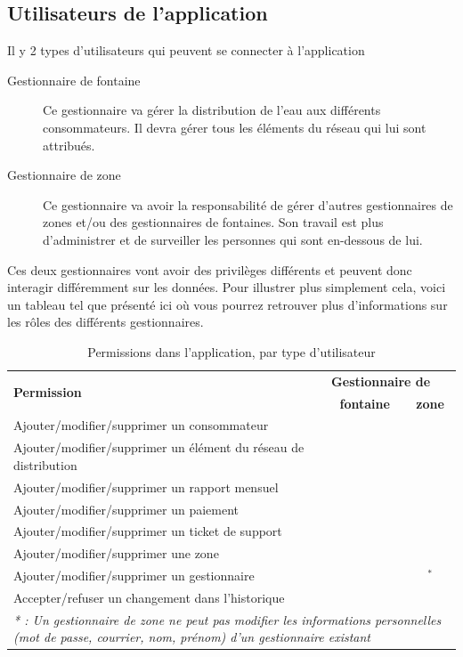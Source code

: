 \documentclass{EPL-master-thesis-covers-FR}
\newcommand{\cmark}{\ding{51}}%
\newcommand{\xmark}{\ding{55}}%
\begin{document}
			\subsection{Utilisateurs de l'application}
				Il y 2 types d'utilisateurs qui peuvent se connecter à l'application
				
				\begin{description}
					\item[Gestionnaire de fontaine] Ce gestionnaire va gérer la distribution de l'eau aux différents consommateurs. Il devra gérer tous les éléments du réseau qui lui sont attribués.
					\item[Gestionnaire de zone] Ce gestionnaire va avoir la responsabilité de gérer d'autres gestionnaires de zones et/ou des gestionnaires de fontaines. Son travail est plus d'administrer et de surveiller les personnes qui sont en-dessous de lui.			 
				\end{description}
				
				Ces deux gestionnaires vont avoir des privilèges différents et peuvent donc interagir différemment sur les données. Pour illustrer plus simplement cela, voici un tableau tel que présenté ici \cite{ref:haitiwater} où vous pourrez retrouver plus d'informations sur les rôles des différents gestionnaires. 
				\begin{table}[H]
					\centering
					\small
					\setlength\tabcolsep{2pt}
					\begin{tabular}{|l|c|c|}
						\hline
						\multirow{2}{*}{\textbf{Permission}} & \multicolumn{2}{l|}{\textbf{Gestionnaire de}} \\ \cline{2-3}
						 & \textbf{fontaine} & \textbf{zone} \\ \hline
						 Ajouter/modifier/supprimer un consommateur & \cmark & \cmark \\ \hline
						 Ajouter/modifier/supprimer un élément du réseau de distribution & \cmark & \cmark \\ \hline
						 Ajouter/modifier/supprimer un rapport mensuel & \cmark & \cmark \\ \hline
						 Ajouter/modifier/supprimer un paiement & \cmark & \cmark \\ \hline
						 Ajouter/modifier/supprimer un ticket de support & \cmark & \cmark \\ \hline
						 Ajouter/modifier/supprimer une zone & \xmark & \cmark \\ \hline
						 Ajouter/modifier/supprimer un gestionnaire & \xmark & \cmark$^{*}$ \\ \hline
						 Accepter/refuser un changement dans l'historique & \xmark & \cmark \\ \hline
						 \multicolumn{3}{p{\textwidth}}{\emph{* : Un gestionnaire de zone ne peut pas modifier les informations personnelles (mot de passe, courrier, nom, prénom) d'un gestionnaire existant}} \\
					\end{tabular}
					\caption{Permissions dans l'application, par type d'utilisateur}
					\label{tab:permissions}
				\end{table}
				
\end{document}
